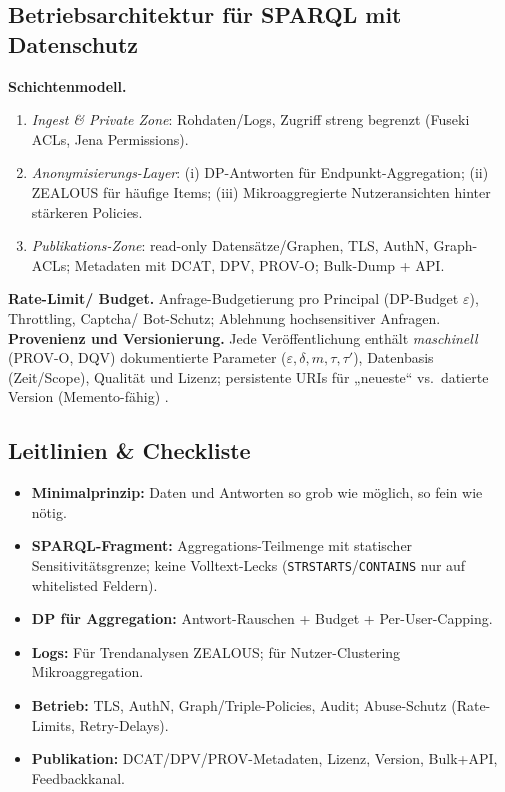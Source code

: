 \subsection{Betriebsarchitektur für SPARQL mit Datenschutz}
\textbf{Schichtenmodell.}
\begin{enumerate}
  \item \emph{Ingest \& Private Zone}: Rohdaten/Logs, Zugriff streng begrenzt (Fuseki ACLs, Jena Permissions).
  \item \emph{Anonymisierungs-Layer}: (i) DP-Antworten für Endpunkt-Aggregation; (ii) ZEALOUS für häufige Items; (iii) Mikroaggregierte Nutzeransichten hinter stärkeren Policies.
  \item \emph{Publikations-Zone}: read-only Datensätze/Graphen, TLS, AuthN, Graph-ACLs; Metadaten mit DCAT, DPV, PROV-O; Bulk-Dump + API.
\end{enumerate}
\textbf{Rate-Limit/ Budget.} Anfrage-Budgetierung pro Principal (DP-Budget $\varepsilon$), Throttling, Captcha/ Bot-Schutz; Ablehnung hochsensitiver Anfragen. 
\textbf{Provenienz und Versionierung.} Jede Veröffentlichung enthält \emph{maschinell} (PROV-O, DQV) dokumentierte Parameter ($\varepsilon,\delta,m,\tau,\tau'$), Datenbasis (Zeit/Scope), Qualität und Lizenz; persistente URIs für „neueste“ vs.\ datierte Version (Memento-fähig) \cite{W3CDWBP}.

\subsection{Leitlinien \& Checkliste}
\begin{itemize}
  \item \textbf{Minimalprinzip:} Daten und Antworten so grob wie möglich, so fein wie nötig.
  \item \textbf{SPARQL-Fragment:} Aggregations-Teilmenge mit statischer Sensitivitätsgrenze; keine Volltext-Lecks (\texttt{STRSTARTS}/\texttt{CONTAINS} nur auf whitelisted Feldern).
  \item \textbf{DP für Aggregation:} Antwort-Rauschen + Budget + Per-User-Capping.
  \item \textbf{Logs:} Für Trendanalysen ZEALOUS; für Nutzer-Clustering Mikroaggregation.
  \item \textbf{Betrieb:} TLS, AuthN, Graph/Triple-Policies, Audit; Abuse-Schutz (Rate-Limits, Retry-Delays).
  \item \textbf{Publikation:} DCAT/DPV/PROV-Metadaten, Lizenz, Version, Bulk+API, Feedbackkanal.
\end{itemize}

